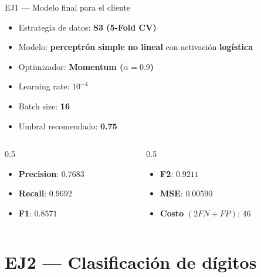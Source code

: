 \documentclass[aspectratio=169,10pt]{beamer}
\begin{document}
\begin{frame}{EJ1 --- Modelo final para el cliente}
  \small
  \begin{itemize}
    \item Estrategia de datos: \textbf{S3 (5-Fold CV)}
    \item Modelo: \textbf{perceptrón simple no lineal} con activación \textbf{logística}
    \item Optimizador: \textbf{Momentum ($\alpha = 0.9$)}
    \item Learning rate: \textbf{$10^{-4}$}
    \item Batch size: \textbf{16}
    \item Umbral recomendado: \textbf{0.75}
  \end{itemize}

  \vspace{0.4em}
  \begin{columns}[T,onlytextwidth]
    \begin{column}{0.5\linewidth}
      \begin{itemize}
        \item \textbf{Precision}: $0.7683$
        \item \textbf{Recall}: $0.9692$
        \item \textbf{F1}: $0.8571$
      \end{itemize}
    \end{column}
    \begin{column}{0.5\linewidth}
      \begin{itemize}
        \item \textbf{F2}: $0.9211$
        \item \textbf{MSE}: $0.00590$
        \item \textbf{Costo} $(2FN + FP)$: $46$
      \end{itemize}
    \end{column}
  \end{columns}
\end{frame}

\section{EJ2 — Clasificación de dígitos}
\end{document}
